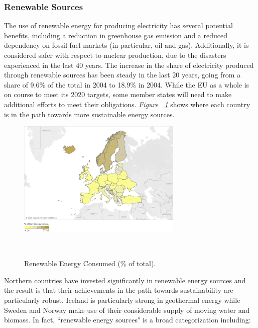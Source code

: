 \documentclass[a4paper,12pt]{book}
\begin{document}
\subsubsection*{Renewable Sources}

The use of renewable energy for producing electricity has several potential benefits, including a reduction in greenhouse gas emission and a reduced dependency on fossil fuel markets (in particular, oil and gas). Additionally, it is considered safer with respect to nuclear production, due to the disasters experienced in the last 40 years. The increase in the share of electricity produced through renewable sources has been steady in the last 20 years, going from a share of 9.6\% of the total in 2004 to 18.9\% in 2004. While the EU as a whole is on course to meet its 2020 targets, some member states will need to make additional efforts to meet their obligations.
\textit{Figure ~\ref{fig:ren}} shows where each country is in the path towards more sustainable energy sources.

\begin{figure}[tb]
\begin{center}
\captionsetup{justification=centering}
\includegraphics[width=0.7\textwidth]{Images/ren.png}
\caption{Renewable Energy Consumed (\% of total). }
~\label{fig:ren}
\end{center}
\end{figure}

Northern countries have invested significantly in renewable energy sources and the result is that their achievements in the path towards sustainability are particularly robust. Iceland is particularly strong in geothermal energy while Sweden and Norway make use of their considerable supply of moving water and biomass. In fact, ``renewable energy sources" is a broad categorization including:
\end{document}
